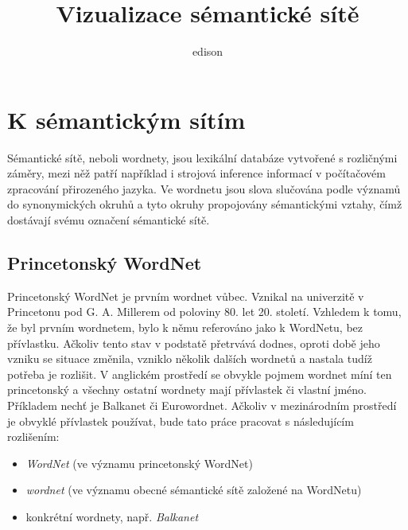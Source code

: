 \documentclass[a4paper, 11pt, oneside]{book}
\author{edison}
\title{Vizualizace sémantické sítě}
\begin{document}
	\maketitle

	\newpage

	\tableofcontents

	\newpage

	\part{K sémantickým sítím}

		Sémantické sítě, neboli wordnety, jsou lexikální databáze vytvořené s rozličnými záměry, mezi něž patří například i strojová inference informací v počítačovém zpracování přirozeného jazyka. Ve wordnetu jsou slova slučována podle významů do synonymických okruhů a tyto okruhy propojovány sémantickými vztahy, čímž dostávají svému označení sémantické sítě.

		\chapter{Princetonský WordNet} %
		\label{cha:princeton_wn}
		
			Princetonský WordNet je prvním wordnet vůbec. Vznikal na univerzitě v Princetonu pod G. A. Millerem od poloviny 80. let 20. století. Vzhledem k tomu, že byl prvním wordnetem, bylo k němu referováno jako k WordNetu, bez přívlastku. Ačkoliv tento stav v podstatě přetrvává dodnes, oproti době jeho vzniku se situace změnila, vzniklo několik dalších wordnetů a nastala tudíž potřeba je rozlišit. V anglickém prostředí se obvykle pojmem wordnet míní ten princetonský a všechny ostatní wordnety mají přívlastek či vlastní jméno. Příkladem nechť je Balkanet či Eurowordnet. Ačkoliv v mezinárodním prostředí je obvyklé přívlastek  používat, bude tato práce pracovat s následujícím rozlišením:

			\begin{itemize}
				\item \textit{WordNet} (ve významu princetonský WordNet)
				\item \textit{wordnet} (ve významu obecné sémantické sítě založené na WordNetu)
				\item konkrétní wordnety, např. \textit{Balkanet}
			\end{itemize}
\end{document}
